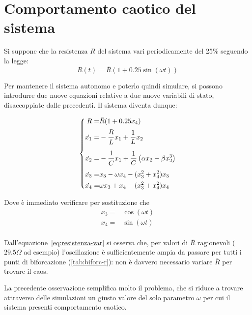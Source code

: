 \section{Comportamento caotico del sistema}

Si suppone che la resistenza $R$ del sistema vari periodicamente del 25\% seguendo la legge:
\begin{equation}
    R(t) = \bar{R} (1+0.25 \sin(\omega t))
    \label{eq:resistenza-var}
\end{equation}

Per mantenere il sistema autonomo e poterlo quindi simulare, si possono introdurre due nuove equazioni relative a due nuove variabili di stato, disaccoppiate dalle precedenti.
Il sistema diventa dunque:

\begin{equation}
    \left\{
    \begin{aligned}
        R =& \bar{R} (1+0.25 x_4) \\
        \dot{x_1} =& -\frac{\strut R}{\strut L}x_1 + \frac{1}{L} x_2\\
        \dot{x_2} =& -\frac{\strut 1}{\strut C} x_1 + \frac{1}{C}\left( \alpha x_2 - \beta x_2^3\right)\\
        \dot{x_3} =& x_3 - \omega x_4 - (x_3^2+x_4^2) x_3 \\
        \dot{x_4} =& \omega x_3 + x_4 - (x_3^2+x_4^2) x_4 \\
    \end{aligned}
    \right.
    \label{eq:sistema-chaos}
\end{equation}

Dove è immediato verificare per sostituzione che
\begin{equation}
    \begin{aligned}
        x_3 =& \cos (\omega t)\\
        x_4 =& \sin (\omega t)\\
    \end{aligned}
\end{equation}

Dall'equazione~\ref{eq:resistenza-var} si osserva che, per valori di $\bar{R}$ ragionevoli ($29.5 \Omega$ ad esempio) l'oscillazione è sufficientemente ampia da passare per tutti i punti di biforcazione (\autoref{tab:biforc-r}): non è davvero necessario variare $\bar{R}$ per trovare il caos.

La precedente osservazione semplifica molto il problema, che si riduce a trovare attraverso delle simulazioni un giusto valore del solo parametro $\omega$ per cui il sistema presenti comportamento caotico.

